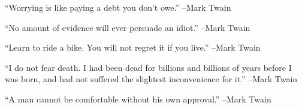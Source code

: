 \documentclass{article}%
\begin{document}
\linebreak%
\vspace{1mm}%
\begin{minipage}{\textwidth}%
\flushleft%
“Worrying is like paying a debt you don't owe.”%
\linebreak%
\vspace{1mm}%
–Mark Twain%
\linebreak%
\vspace{1mm}%
\end{minipage}%
\linebreak%
\vspace{1mm}%
\begin{minipage}{\textwidth}%
\flushleft%
“No amount of evidence will ever persuade an idiot.”%
\linebreak%
\vspace{1mm}%
–Mark Twain%
\linebreak%
\vspace{1mm}%
\end{minipage}%
\linebreak%
\vspace{1mm}%
\begin{minipage}{\textwidth}%
\flushleft%
“Learn to ride a bike. You will not regret it if you live.”%
\linebreak%
\vspace{1mm}%
–Mark Twain%
\linebreak%
\vspace{1mm}%
\end{minipage}%
\linebreak%
\vspace{1mm}%
\begin{minipage}{\textwidth}%
\flushleft%
“I do not fear death. I had been dead for billions and billions of years before I was born, and had not suffered the slightest inconvenience for it.”%
\linebreak%
\vspace{1mm}%
–Mark Twain%
\linebreak%
\vspace{1mm}%
\end{minipage}%
\linebreak%
\vspace{1mm}%
\begin{minipage}{\textwidth}%
\flushleft%
“A man cannot be comfortable without his own approval.”%
\linebreak%
\vspace{1mm}%
–Mark Twain%
\linebreak%
\vspace{1mm}%
\end{minipage}%
\end{document}
